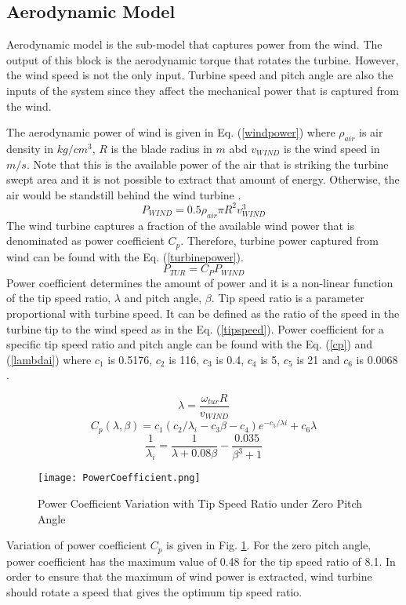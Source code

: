 \subsection{Aerodynamic Model}
Aerodynamic model is the sub-model that captures power from the wind. The output of this block is the aerodynamic torque that rotates the turbine. However, the wind speed is not the only input. Turbine speed and pitch angle are also the inputs of the system since they affect the mechanical power that is captured from the wind.\par
The aerodynamic power of wind is given in Eq. (\ref{windpower}) where $\rho_{air}$ is air density in $kg/cm^{3}$, $R$ is the blade radius in $m$ abd $v_{WIND}$ is the wind speed in $m/s$. Note that this is the available power of the air that is striking the turbine swept area and it is not possible to extract that amount of energy. Otherwise, the air would be standstill behind the wind turbine \cite{Ackermann2005a}.
\begin{equation}
P_{WIND}=0.5\rho_{air}\pi R^{2} v_{WIND}^{3}
\label{windpower}
\end{equation}
The wind turbine captures a fraction of the available wind power that is denominated as power coefficient $C_{p}$. Therefore, turbine power captured from wind can be found with the Eq. (\ref{turbinepower}).
\begin{equation}
P_{TUR}=C_{P}P_{WIND}
\label{turbinepower}
\end{equation}
Power coefficient determines the amount of power and it is a non-linear function of the tip speed ratio, $\lambda$ and pitch angle, $\beta$. Tip speed ratio is a parameter proportional with turbine speed. It can be defined as the ratio of the speed in the turbine tip to the wind speed as in the Eq. (\ref{tipspeed}). Power coefficient for a specific tip speed ratio and pitch angle can be found with the Eq. (\ref{cp}) and (\ref{lambdai}) where $c_{1}$ is 0.5176, $c_{2}$ is 116, $c_{3}$ is 0.4, $c_{4}$ is 5, $c_{5}$ is 21 and $c_{6}$ is 0.0068 \cite{Heier}.\par
\begin{equation}
\lambda=\frac{\omega_{tur}R}{v_{WIND}}
\label{tipspeed}
\end{equation}
\begin{equation}
C_{p}(\lambda,\beta)=c_{1}(c_{2}/\lambda_{i}-c_{3}\beta-c_{4})e^{-c_{5}/\lambda{i}}+c_{6}\lambda
\label{cp}
\end{equation}
\begin{equation}
\frac{1}{\lambda_{i}}=\frac{1}{\lambda+0.08\beta}-\frac{0.035}{\beta^{3}+1} 
\label{lambdai}
\end{equation}
\begin{figure}[h!]
	\centering
	\texttt{[image: PowerCoefficient.png]}
	\caption{Power Coefficient Variation with Tip Speed Ratio under Zero Pitch Angle}
	\label{variationofcp}
\end{figure} 
\par
Variation of power coefficient $C_{p}$ is given in Fig. \ref{variationofcp}. For the zero pitch angle, power coefficient has the maximum value of 0.48 for the tip speed ratio of 8.1. In order to ensure that the maximum of wind power is extracted, wind turbine should rotate a speed that gives the optimum tip speed ratio. 
